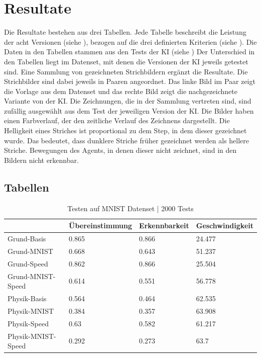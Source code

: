 \chapter{Resultate}
Die Resultate bestehen aus drei Tabellen. Jede Tabelle beschreibt die Leistung
der acht Versionen (siehe ), bezogen auf die drei definierten
Kriterien (siehe ). Die Daten in den Tabellen
stammen aus den Tests der KI (siehe )
Der Unterschied in den Tabellen liegt im Datenset, mit denen die Versionen der
KI jeweils getestet sind. 
Eine Sammlung von gezeichneten Strichbildern ergänzt die Resultate. Die
Strichbilder sind dabei jeweils in Paaren angeordnet. Das linke Bild im Paar
zeigt die Vorlage aus dem Datenset und das rechte Bild zeigt die nachgezeichnete
Variante von der KI. Die Zeichnungen, die in der Sammlung
vertreten sind, sind zufällig ausgewählt aus dem Test der jeweiligen Version der
KI. Die Bilder haben einen Farbverlauf, der den zeitliche
Verlauf des Zeichnens dargestellt. Die Helligkeit eines Striches ist
proportional zu dem Step, in dem dieser gezeichnet wurde. Das bedeutet, dass
dunklere Striche früher gezeichnet werden als hellere Striche. Bewegungen des
Agents, in denen dieser nicht zeichnet, sind in den Bildern nicht erkennbar.

\newpage
\section{Tabellen}
\begin{table}[!ht]
    \centering
    \caption{Testen auf MNIST Datenset | 2000 Tests}
    \begin{tabular}{|l|l|l|l|}
        \hline
            ~ & Übereinstimmung  & Erkennbarkeit  & Geschwindigkeit \\ \hline
            Grund-Basis & 0.865 & 0.866 & 24.477 \\ \hline
            Grund-MNIST & 0.668 & 0.643 & 51.237 \\ \hline
            Grund-Speed & 0.862 & 0.866 & 25.504 \\ \hline
            Grund-MNIST-Speed & 0.614 & 0.551 & 56.778 \\ \hline
            Physik-Basis & 0.564 & 0.464 & 62.535 \\ \hline
            Physik-MNIST & 0.384 & 0.357 & 63.908 \\ \hline
            Physik-Speed & 0.63 & 0.582 & 61.217 \\ \hline
            Physik-MNIST-Speed & 0.292 & 0.273 & 63.7 \\ \hline
        \end{tabular}
    \label{tab:MNIST}
\end{table}

